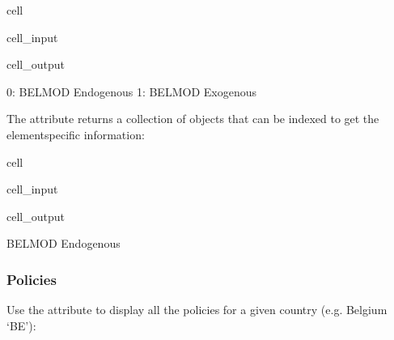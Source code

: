 \documentclass[letterpaper,10pt,english]{sphinxmanual}
\begin{document}
\begin{sphinxuseclass}{cell}
\begin{sphinxuseclass}{cell_input}
\begin{sphinxVerbatim}[commandchars=\\\{\}]
\PYG{p}{[}\PYG{p}{]}
\end{sphinxVerbatim}

\end{sphinxuseclass}
\begin{sphinxuseclass}{cell_output}
\begin{sphinxVerbatim}[commandchars=\\\{\}]
0: BELMOD \PYGZhy{} Endogenous
1: BELMOD \PYGZhy{} Exogenous 
\end{sphinxVerbatim}

\end{sphinxuseclass}
\end{sphinxuseclass}
\sphinxAtStartPar
The attribute returns a collection of  objects that can be indexed to get the element\sphinxhyphen{}specific information:

\begin{sphinxuseclass}{cell}
\begin{sphinxuseclass}{cell_input}
\begin{sphinxVerbatim}[commandchars=\\\{\}]
\PYG{p}{[}\PYG{p}{]}\PYG{p}{[}\PYG{p}{]}
\end{sphinxVerbatim}

\end{sphinxuseclass}
\begin{sphinxuseclass}{cell_output}
\begin{sphinxVerbatim}[commandchars=\\\{\}]
\PYGZsq{}BELMOD \PYGZhy{} Endogenous\PYGZsq{}
\end{sphinxVerbatim}

\end{sphinxuseclass}
\end{sphinxuseclass}

\subsubsection{Policies}
\label{\detokenize{notebooks/userguide:policies}}
\sphinxAtStartPar
Use the attribute  to display all the policies for a given country (e.g. Belgium ‘BE’):
\end{document}
